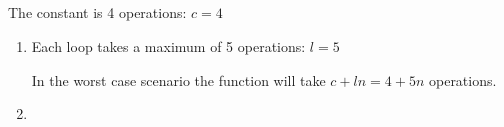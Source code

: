 \documentclass[12pt]{article}
\begin{document}
\subsection{} %
The constant is 4 operations: $c = 4$

\begin{enumerate}[a]
	\item %
	Each loop takes a maximum of 5 operations: $l = 5$

	In the worst case scenario the function will take $c + ln = 4 + 5n$ operations.

	\item %
\end{enumerate}

\subsection{} %

\subsection{} %

\subsection{} %
\end{document}

